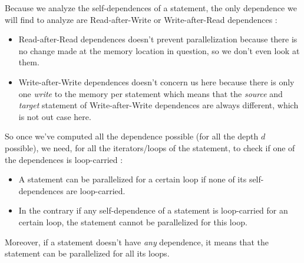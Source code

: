 \documentclass[paper=a4, fontsize=11pt]{scrartcl}
\numberwithin{equation}{section}        %
\numberwithin{figure}{section}          %
\numberwithin{table}{section}               %
\begin{document}
        \bigskip

        Because we analyze the \glspl{self-dependence} of a statement, the only
        dependence we will find to analyze are Read-after-Write or Write-after-Read dependences :
        \begin{itemize}
            \item Read-after-Read dependences doesn't prevent parallelization because there is no
                change made at the memory location in question, so we don't even look at them.
        
            \item Write-after-Write dependences doesn't concern us here because there is
                only one \textit{write} to the memory per statement which means that
                the \textit{source} and \textit{target} statement of Write-after-Write
                dependences are always different, which is not out case here.
        \end{itemize}
        
        So once we've computed all the dependence possible (for all the depth $d$ possible),
        we need, for all the iterators/loops of the statement, to check if one of the dependences
        is loop-carried :
        \begin{itemize}
            \item A statement can be parallelized for a certain loop if none of its \glspl{self-dependence}
                are loop-carried.
            \item In the contrary if any \gls{self-dependence} of a statement is loop-carried for an certain loop,
                the statement cannot be parallelized for this loop.
        \end{itemize}
        Moreover, if a statement doesn't have \textit{any} dependence, it means that the
        statement can be parallelized for all its loops.

        \bigskip
\end{document}
